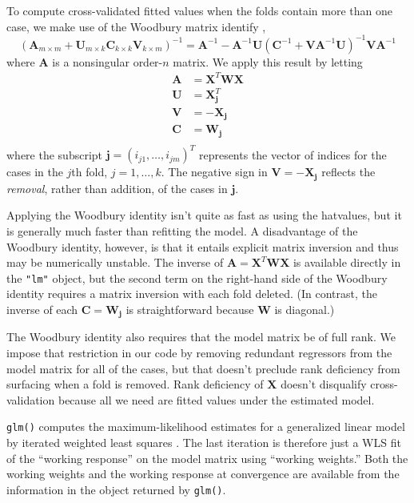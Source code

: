 \documentclass[
]{jss}
\begin{document}
To compute cross-validated fitted values when the folds contain more
than one case, we make use of the Woodbury matrix identify
\citep{Wikipedia-Woodbury:2023}, \[
\left(\mathbf{A}_{m \times m} + \mathbf{U}_{m \times k} 
\mathbf{C}_{k \times k} \mathbf{V}_{k \times m} \right)^{-1} = \mathbf{A}^{-1} - \mathbf{A}^{-1}\mathbf{U} \left(\mathbf{C}^{-1} + 
\mathbf{VA}^{-1}\mathbf{U} \right)^{-1} \mathbf{VA}^{-1}
\] where \(\mathbf{A}\) is a nonsingular order-\(n\) matrix. We apply
this result by letting \begin{align*}
    \mathbf{A} &= \mathbf{X}^T \mathbf{W} \mathbf{X} \\
    \mathbf{U} &= \mathbf{X}_\mathbf{j}^T \\
    \mathbf{V} &= - \mathbf{X}_\mathbf{j} \\
    \mathbf{C} &= \mathbf{W}_\mathbf{j} \\
\end{align*} where the subscript
\(\mathbf{j} = (i_{j1}, \ldots, i_{jm})^T\) represents the vector of
indices for the cases in the \(j\)th fold, \(j = 1, \ldots, k\). The
negative sign in \(\mathbf{V} = - \mathbf{X}_\mathbf{j}\) reflects the
\emph{removal}, rather than addition, of the cases in \(\mathbf{j}\).

Applying the Woodbury identity isn't quite as fast as using the
hatvalues, but it is generally much faster than refitting the model. A
disadvantage of the Woodbury identity, however, is that it entails
explicit matrix inversion and thus may be numerically unstable. The
inverse of \(\mathbf{A} = \mathbf{X}^T \mathbf{W} \mathbf{X}\) is
available directly in the \texttt{"lm"} object, but the second term on
the right-hand side of the Woodbury identity requires a matrix inversion
with each fold deleted. (In contrast, the inverse of each
\(\mathbf{C} = \mathbf{W}_\mathbf{j}\) is straightforward because
\(\mathbf{W}\) is diagonal.)

The Woodbury identity also requires that the model matrix be of full
rank. We impose that restriction in our code by removing redundant
regressors from the model matrix for all of the cases, but that doesn't
preclude rank deficiency from surfacing when a fold is removed. Rank
deficiency of \(\mathbf{X}\) doesn't disqualify cross-validation because
all we need are fitted values under the estimated model.

\texttt{glm()} computes the maximum-likelihood estimates for a
generalized linear model by iterated weighted least squares \citep[see,
e.g.,][Sec. 6.12]{FoxWeisberg:2019}. The last iteration is therefore
just a WLS fit of the ``working response'' on the model matrix using
``working weights.'' Both the working weights and the working response
at convergence are available from the information in the object returned
by \texttt{glm()}.
\end{document}
